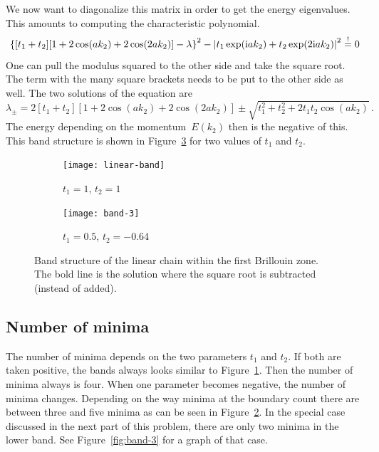 \documentclass[11pt, english, fleqn, DIV=15, headinclude, BCOR=1cm]{scrartcl}
\begin{document}
We now want to diagonalize this matrix in order to get the energy eigenvalues.
This amounts to computing the characteristic polynomial.
\[
    \left\{ [t_1 + t_2][1 + 2 \cos(ak_2) + 2 \cos(2 ak_2)] - \lambda \right\}^2
    - \left| t_1 \exp(\mathrm i a k_2) + t_2 \exp(2 \mathrm i a k_2) \right|^2
    \overset != 0
\]
One can pull the modulus squared to the other side and take the square root.
The term with the many square brackets needs to be put to the other side as
well. The two solutions of the equation are
\[
    \lambda_\pm
    = 2 [t_1 + t_2][1 + 2 \cos(ak_2) + 2 \cos(2 ak_2)]
    \pm \sqrt{t_1^2 + t_2^2 + 2 t_1 t_2 \cos(ak_2)} \,.
\]
The energy depending on the momentum~$E(k_2)$ then is the negative of this.
This band structure is shown in Figure~\ref{fig:linear-band} for two values of
$t_1$ and $t_2$.

\begin{figure}
    \begin{subfigure}[c]{0.5\linewidth}
        \centering
        \texttt{[image: linear-band]}
        \caption{%
            $t_1 = 1$, $t_2 = 1$
        }
        \label{fig:linear-band/1}
    \end{subfigure}
    \begin{subfigure}[c]{0.5\linewidth}
        \centering
        \texttt{[image: band-3]}
        \caption{%
            $t_1 = \num{0.5}$, $t_2 = \num{-0.64}$
        }
        \label{fig:linear-band/2}
    \end{subfigure}
    \caption{%
        Band structure of the linear chain within the first Brillouin zone. The
        bold line is the solution where the square root is subtracted (instead
        of added).
    }
    \label{fig:linear-band}
\end{figure}

\subsection{Number of minima}

The number of minima depends on the two parameters $t_1$ and $t_2$. If both are
taken positive, the bands always looks similar to
Figure~\ref{fig:linear-band/1}. Then the number of minima always is four. When
one parameter becomes negative, the number of minima changes. Depending on the
way minima at the boundary count there are between three and five minima as can
be seen in Figure~\ref{fig:linear-band/2}. In the special case discussed in the
next part of this problem, there are only two minima in the lower band. See
Figure~\ref{fig:band-3} for a graph of that case.
\end{document}

